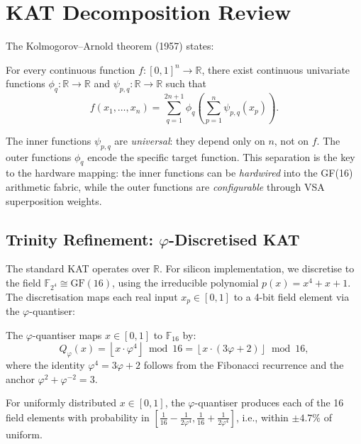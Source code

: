 \section{KAT Decomposition Review}
\label{sec:hwbridge:kat-review}

The Kolmogorov--Arnold theorem (1957) states:

\begin{theorem}
\label{thm:hwbridge:kat}
For every continuous function $f\colon [0,1]^n \to \mathbb{R}$, there exist
continuous univariate functions $\phi_{q}\colon \mathbb{R} \to \mathbb{R}$
and $\psi_{p,q}\colon \mathbb{R} \to \mathbb{R}$ such that
\[
  f(x_1, \ldots, x_n) = \sum_{q=1}^{2n+1} \phi_q\!\left(\sum_{p=1}^{n} \psi_{p,q}(x_p)\right).
\]
\end{theorem}

The inner functions $\psi_{p,q}$ are \emph{universal}: they depend only on $n$,
not on $f$. The outer functions $\phi_q$ encode the specific target function.
This separation is the key to the hardware mapping: the inner functions can be
\emph{hardwired} into the GF(16) arithmetic fabric, while the outer functions
are \emph{configurable} through VSA superposition weights.

\subsection{Trinity Refinement: $\varphi$-Discretised KAT}

The standard KAT operates over $\mathbb{R}$. For silicon implementation, we
discretise to the field $\mathbb{F}_{2^4} \cong \mathrm{GF}(16)$, using the
irreducible polynomial $p(x) = x^4 + x + 1$. The discretisation maps each
real input $x_p \in [0,1]$ to a 4-bit field element via the $\varphi$-quantiser:

\begin{definition}
\label{def:hwbridge:phi-quant}
The $\varphi$-quantiser maps $x \in [0,1]$ to $\mathbb{F}_{16}$ by:
\[
  Q_\varphi(x) = \left\lfloor x \cdot \varphi^4 \right\rfloor \bmod 16
  = \left\lfloor x \cdot (3\varphi + 2) \right\rfloor \bmod 16,
\]
where the identity $\varphi^4 = 3\varphi + 2$ follows from the Fibonacci recurrence
and the anchor $\varphi^2 + \varphi^{-2} = 3$.
\end{definition}

\begin{proposition}
\label{prop:hwbridge:quant-range}
For uniformly distributed $x \in [0,1]$, the $\varphi$-quantiser produces each
of the 16 field elements with probability in $[\tfrac{1}{16} - \tfrac{1}{2\varphi^4},
\tfrac{1}{16} + \tfrac{1}{2\varphi^4}]$, i.e., within $\pm 4.7\%$ of uniform.
\end{proposition}

